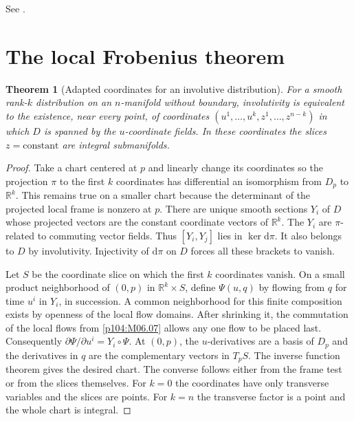 \documentclass[11pt,oneside,openany]{book}
\newtheorem{theorem}{Theorem}[chapter]
\theoremstyle{definition}
\theoremstyle{remark}
\newcommand{\R}{\mathbb R}
\newcommand{\dd}{\mathrm d}
\begin{document}
See \cite[Proposition 19.3, Lemma 19.4, Theorem 19.7 and Proposition 19.11]{lee}.

\section{The local Frobenius theorem}

\begin{theorem}[Adapted coordinates for an involutive distribution]
\label{p104:M08.02}
For a smooth rank-\(k\) distribution on an \(n\)-manifold without boundary, involutivity is equivalent to the existence, near every point, of coordinates \((u^1,\ldots,u^k,z^1,\ldots,z^{n-k})\) in which \(D\) is spanned by the \(u\)-coordinate fields. In these coordinates the slices \(z=\mathrm{constant}\) are integral submanifolds.
\end{theorem}

\begin{proof}
Take a chart centered at \(p\) and linearly change its coordinates so the projection \(\pi\) to the first \(k\) coordinates has differential an isomorphism from \(D_p\) to \(\R^k\). This remains true on a smaller chart because the determinant of the projected local frame is nonzero at \(p\). There are unique smooth sections \(Y_i\) of \(D\) whose projected vectors are the constant coordinate vectors of \(\R^k\). The \(Y_i\) are \(\pi\)-related to commuting vector fields. Thus \([Y_i,Y_j]\) lies in \(\ker\dd\pi\). It also belongs to \(D\) by involutivity. Injectivity of \(\dd\pi\) on \(D\) forces all these brackets to vanish.

Let \(S\) be the coordinate slice on which the first \(k\) coordinates vanish. On a small product neighborhood of \((0,p)\) in \(\R^k\times S\), define \(\Psi(u,q)\) by flowing from \(q\) for time \(u^i\) in \(Y_i\), in succession. A common neighborhood for this finite composition exists by openness of the local flow domains. After shrinking it, the commutation of the local flows from \cref{p104:M06.07} allows any one flow to be placed last. Consequently \(\partial\Psi/\partial u^i=Y_i\circ\Psi\). At \((0,p)\), the \(u\)-derivatives are a basis of \(D_p\) and the derivatives in \(q\) are the complementary vectors in \(T_pS\). The inverse function theorem gives the desired chart. The converse follows either from the frame test or from the slices themselves. For \(k=0\) the coordinates have only transverse variables and the slices are points. For \(k=n\) the transverse factor is a point and the whole chart is integral.
\end{proof}
\end{document}
